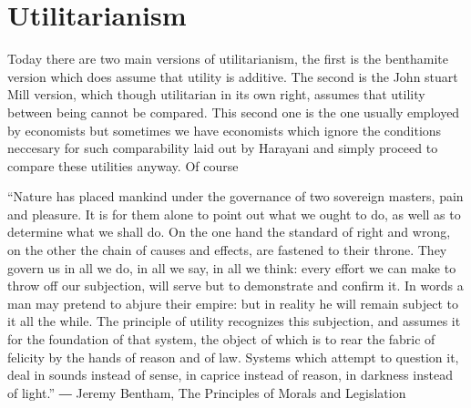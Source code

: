 
\section{Utilitarianism} 


Today there are two main versions of utilitarianism, the first is the benthamite version which does assume that utility is additive. The second is the John stuart Mill version, which though utilitarian in its own right, assumes that utility between being cannot be compared. This second one is the one usually employed by economists but sometimes we have economists which ignore the conditions neccesary for such comparability laid out by Harayani and simply proceed to compare these utilities anyway. Of course 


\begin{tcolorbox}[enhanced,%
  colback=green!25!black!10!white,colframe=green!75!black,title=Principle of utility (10cm),
  drop fuzzy shadow,watermark color=white,watermark text=Fit]
“Nature has placed mankind under the governance of two sovereign masters, pain and pleasure. It is for them alone to point out what we ought to do, as well as to determine what we shall do. On the one hand the standard of right and wrong, on the other the chain of causes and effects, are fastened to their throne. They govern us in all we do, in all we say, in all we think: every effort we can make to throw off our subjection, will serve but to demonstrate and confirm it. In words a man may pretend to abjure their empire: but in reality he will remain subject to it all the while. The principle of utility recognizes this subjection, and assumes it for the foundation of that system, the object of which is to rear the fabric of felicity by the hands of reason and of law. Systems which attempt to question it, deal in sounds instead of sense, in caprice instead of reason, in darkness instead of light.”
― Jeremy Bentham, The Principles of Morals and Legislation
\end{tcolorbox}

